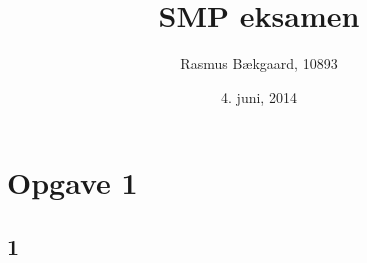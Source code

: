 \documentclass{article}
\title{SMP eksamen}
\date{4. juni, 2014}
\author{Rasmus Bækgaard, 10893}
\begin{document}
\maketitle

\section*{Opgave 1} %
\label{sec:section_name}

\subsection*{1} %
\label{sub:1}
\end{document}
